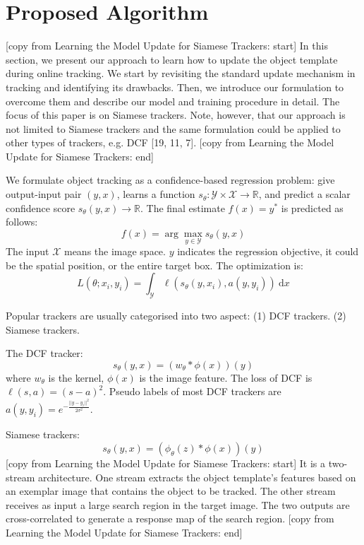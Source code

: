 \documentclass[journal]{IEEEtran}
\begin{document}
\section{Proposed Algorithm} 
[copy from Learning the Model Update for Siamese Trackers: start]
In this section, we present our approach to learn how to update the object template during online tracking. We start
by revisiting the standard update mechanism in tracking and identifying its drawbacks. Then, we introduce our formulation to overcome them and describe our model and training procedure in detail. The focus of this paper is on Siamese
trackers. Note, however, that our approach is not limited to Siamese trackers and the same formulation could be applied
to other types of trackers, e.g. DCF [19, 11, 7].
[copy from Learning the Model Update for Siamese Trackers: end]

We formulate object tracking as a confidence-based regression problem: give output-input pair $(y,x)$, learns a function $s_\theta:\mathcal{Y\times X\rightarrow \mathbb R}$, and predict a scalar confidence score $s_\theta(y,x)\rightarrow\mathbb R$. The final estimate $f(x)=y^*$ is predicted as follows:
\begin{equation}
f(x) = \arg\max_{y\in \mathcal Y}s_\theta (y,x)
\end{equation}
The input $\mathcal X$ means the image space. $y$ indicates the regression objective, it could be the spatial position, or the entire target box. The optimization is:
\begin{equation}
L(\theta;x_i,y_i)=\int_{\mathcal Y}\ell(s_\theta(y,x_i),a(y,y_i))\ \mathrm{d}x
\end{equation}

Popular trackers are usually categorised into two aspect: (1) DCF trackers. (2) Siamese trackers.

The DCF tracker:
\begin{equation}
s_\theta(y,x)=(w_\theta * \phi(x))(y)
\end{equation}
where $w_\theta$ is the kernel, $\phi(x)$ is the image feature. The loss of DCF is $\ell(s,a)=(s-a)^2$. Pseudo labels of most DCF trackers are $a(y,y_i)=e^{-\frac{||y-y_i||^2}{2\sigma^2}}$.

Siamese trackers:
\begin{equation}
s_\theta(y,x)=(\phi_\theta(z) * \phi(x))(y)
\end{equation}
[copy from Learning the Model Update for Siamese Trackers: start]
It is a two-stream architecture. One stream extracts the object template’s features based on an exemplar image that contains the object to be tracked. The other stream receives as input a large search region in the target image. The two outputs are cross-correlated to generate a response map of the search region.
[copy from Learning the Model Update for Siamese Trackers: end]
\end{document}
